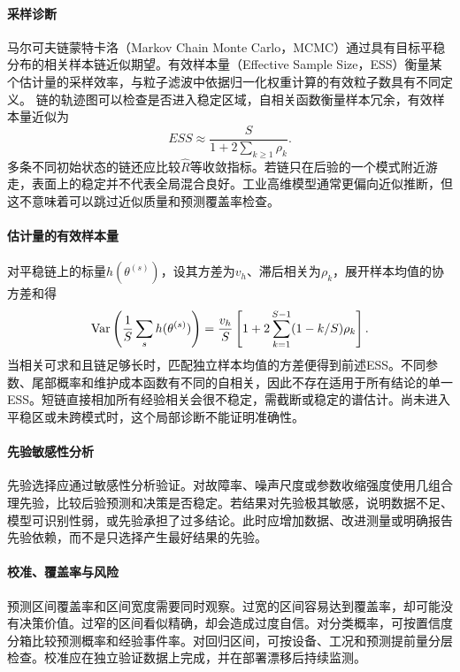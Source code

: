 \paragraph{采样诊断}
马尔可夫链蒙特卡洛（Markov Chain Monte Carlo，MCMC）通过具有目标平稳分布的相关样本链近似期望。有效样本量（Effective Sample Size，ESS）衡量某个估计量的采样效率，与粒子滤波中依据归一化权重计算的有效粒子数具有不同定义。
链的轨迹图可以检查是否进入稳定区域，自相关函数衡量样本冗余，有效样本量近似为
\begin{equation}
 ESS\approx\frac{S}{1+2\sum_{k\geq1}\rho_k}.
\end{equation}
多条不同初始状态的链还应比较$\hat R$等收敛指标。若链只在后验的一个模式附近游走，表面上的稳定并不代表全局混合良好。工业高维模型通常更偏向近似推断，但这不意味着可以跳过近似质量和预测覆盖率检查。

\paragraph{估计量的有效样本量}
对平稳链上的标量$h(\theta^{(s)})$，设其方差为$v_h$、滞后相关为$\rho_k$，展开样本均值的协方差和得
\begin{equation}
 \operatorname{Var}\left(\frac1S\sum_sh(\theta^{(s)})\right)
 =\frac{v_h}{S}\left[1+2\sum_{k=1}^{S-1}(1-k/S)\rho_k\right].
\end{equation}
当相关可求和且链足够长时，匹配独立样本均值的方差便得到前述ESS。不同参数、尾部概率和维护成本函数有不同的自相关，因此不存在适用于所有结论的单一ESS。短链直接相加所有经验相关会很不稳定，需截断或稳定的谱估计。尚未进入平稳区或未跨模式时，这个局部诊断不能证明准确性。

\paragraph{先验敏感性分析}
先验选择应通过敏感性分析验证。对故障率、噪声尺度或参数收缩强度使用几组合理先验，比较后验预测和决策是否稳定。若结果对先验极其敏感，说明数据不足、模型可识别性弱，或先验承担了过多结论。此时应增加数据、改进测量或明确报告先验依赖，而不是只选择产生最好结果的先验。

\paragraph{校准、覆盖率与风险}
预测区间覆盖率和区间宽度需要同时观察。过宽的区间容易达到覆盖率，却可能没有决策价值。过窄的区间看似精确，却会造成过度自信。对分类概率，可按置信度分箱比较预测概率和经验事件率。对回归区间，可按设备、工况和预测提前量分层检查。校准应在独立验证数据上完成，并在部署漂移后持续监测。

